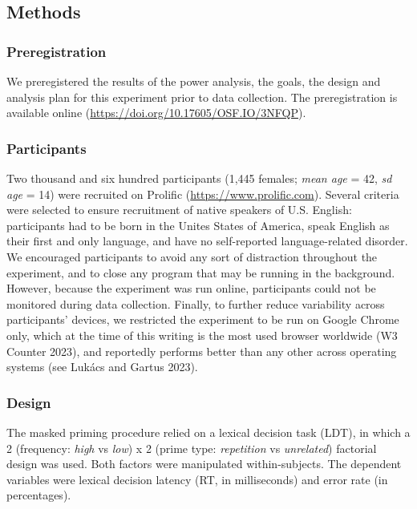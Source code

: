 \documentclass[
]{interact}
\begin{document}
\subsection{Methods}\label{sec-exp1-methods}

\subsubsection{Preregistration}\label{sec-exp1-prereg}

We preregistered the results of the power analysis, the goals, the
design and analysis plan for this experiment prior to data collection.
The preregistration is available online
(\url{https://doi.org/10.17605/OSF.IO/3NFQP}).

\subsubsection{Participants}\label{sec-exp1-methods-participants}

Two thousand and six hundred participants (1,445 females; \emph{mean
age} = 42, \emph{sd age} = 14) were recruited on Prolific
(\url{https://www.prolific.com}). Several criteria were selected to
ensure recruitment of native speakers of U.S. English: participants had
to be born in the Unites States of America, speak English as their first
and only language, and have no self-reported language-related disorder.
We encouraged participants to avoid any sort of distraction throughout
the experiment, and to close any program that may be running in the
background. However, because the experiment was run online, participants
could not be monitored during data collection. Finally, to further
reduce variability across participants' devices, we restricted the
experiment to be run on Google Chrome only, which at the time of this
writing is the most used browser worldwide (W3 Counter 2023), and
reportedly performs better than any other across operating systems (see
Lukács and Gartus 2023).

\subsubsection{Design}\label{sec-exp1-methods-design}

The masked priming procedure relied on a lexical decision task (LDT), in
which a 2 (frequency: \emph{high} vs \emph{low}) x 2 (prime type:
\emph{repetition} vs \emph{unrelated}) factorial design was used. Both
factors were manipulated within-subjects. The dependent variables were
lexical decision latency (RT, in milliseconds) and error rate (in
percentages).
\end{document}
